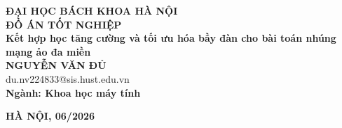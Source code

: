 \documentclass[DoAn.tex]{subfiles}
\begin{document}
\begin{titlepage}
\thispagestyle{empty}
\begin{center}

{\textbf{\large{ĐẠI HỌC BÁCH KHOA HÀ NỘI}}}\\[3cm]

{\textbf{\huge{ĐỒ ÁN TỐT NGHIỆP}}}\\[1cm]
{\textbf{\Large{Kết hợp học tăng cường và tối ưu hóa bầy đàn cho bài toán nhúng mạng ảo đa miền}}}\\[1cm]

{\textbf{\large{NGUYỄN VĂN ĐỦ}}}\\
{\large{du.nv224833@sis.hust.edu.vn}}\\[0.5cm]

{\textbf{\large{Ngành: Khoa học máy tính}}}\\

\vspace{2cm}
\begin{table}[H]
\centering
{}
\end{table}

\vfill

{\textbf{\large{HÀ NỘI, 06/2026}}}
\end{center}

\end{titlepage}
\end{document}
